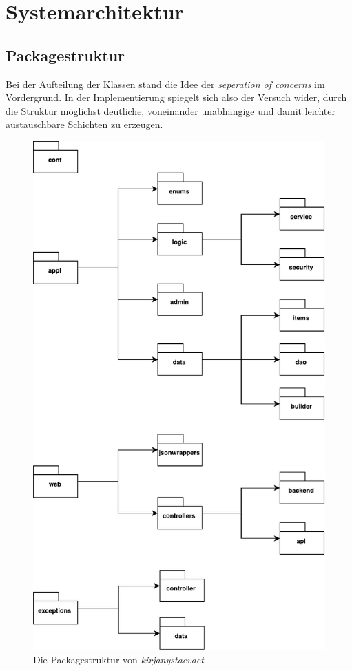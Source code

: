 \section{Systemarchitektur}

\subsection{Packagestruktur}

Bei der Aufteilung der Klassen stand die Idee der \textit{seperation of concerns} im Vordergrund. In der Implementierung spiegelt sich also der Versuch wider, durch die Struktur möglichst deutliche, voneinander unabhängige und damit leichter austauschbare Schichten zu erzeugen.


\begin{figure}[h]
	\centering
	\includegraphics[width=\linewidth]{files/packages}
	\caption{Die Packagestruktur von \textit{kirjanystaevaet}}
	\label{fig:packages}
\end{figure}

